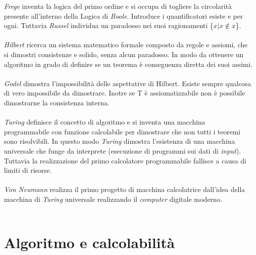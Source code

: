 \documentclass[10pt,a4paper]{book}
\begin{document}
\textit{Frege} inventa la logica del primo ordine e si occupa di togliere la circolarit\`a presente all'interno della Logica di \textit{Boole}. Introduce i quantificatori esiste e per ogni. Tuttavia \textit{Russel} individua un paradosso nei suoi ragionamenti \{$x | x \notin x$\}.\\\\
\noindent
\textit{Hilbert} ricerca un sistema matematico formale composto da regole e assiomi, che si dimostri consistenze e solido, senza alcun paradosso. In modo da ottenere un algoritmo in grado di definire se un teorema \`e conseguenza diretta dei suoi assimi.\\\\
\textit{Godel} dimostra l'impossibilit\`a delle aspettative di Hilbert. Esiste sempre qualcosa di vero impossibile da dimostrare. Inotre se T \`e assiomatizzabile non \`e possibile dimostrarne la consistenza interna.\\\\
\textit{Turing} definisce il concetto di algoritmo e si inventa una macchina programmabile con funzione calcolabile per dimostrare che non tutti i teoremi sono risolvibili. In questo modo \textit{Turing} dimostra l'esistenza di una macchina universale che funge da interprete (esecuzione di programmi sui dati di \textit{input}). Tuttavia la realizzazione del primo calcolatore programmabile fallisce a causa di limiti di risorse.\\\\
\textit{Von Neumann} realizza il primo progetto di macchina calcolatrice dall'idea della macchina di \textit{Turing} universale realizzando il \textit{computer} digitale moderno.\\\\
\pagebreak

\chapter{Algoritmo e calcolabilit\`a}
\end{document}
